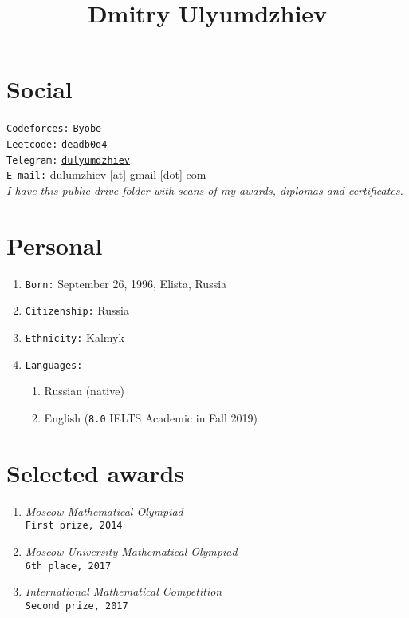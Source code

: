 \documentclass[twocolumn,9pt]{extarticle}
\title{Dmitry Ulyumdzhiev}
\date{}
\begin{document}
\maketitle

\balance

\section{Social}

\texttt{Codeforces:} \href{https://codeforces.com/profile/Byobe}{\texttt{Byobe}} \\
\texttt{Leetcode:} \href{https://leetcode.com/deadb0d4/}{\texttt{deadb0d4}} \\
\texttt{Telegram:} \href{https://t.me/dulyumdzhiev}{\texttt{dulyumdzhiev}} \\
\texttt{E-mail:} \href{mailto:dulumzhiev@gmail.com}{dulumzhiev [at] gmail [dot] com} \\

\textit{I have this public \href{https://drive.google.com/drive/folders/1NT6w2IOH1FO1XDOfCJ9cktBSh_USbbWq?usp=sharing}{drive folder} with scans of my awards, diplomas and certificates.}

\section{Personal}

\begin{enumerate}
  \item \texttt{Born:} September 26, 1996, Elista, Russia
  \item \texttt{Citizenship:} Russia
  \item \texttt{Ethnicity:} Kalmyk
  \item \texttt{Languages:}
    \begin{enumerate}
      \item Russian (native)
      \item English (\texttt{8.0} IELTS Academic in Fall 2019)
    \end{enumerate}
\end{enumerate}

\section{Selected awards}

\begin{enumerate}
  \item \textit{Moscow Mathematical Olympiad} \\
    \quad \texttt{First prize, 2014}
  \item \textit{Moscow University Mathematical Olympiad} \\
    \quad \texttt{6th place, 2017}
  \item \textit{International Mathematical Competition} \\
    \quad \texttt{Second prize, 2017}
\end{enumerate}
\end{document}
